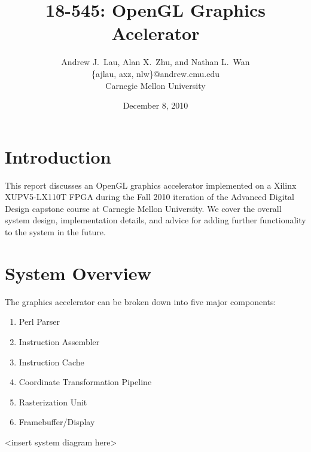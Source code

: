 \documentclass[letterpaper,10pt]{article}
\begin{document}

\title{\Large \bf 18-545: OpenGL Graphics Acelerator}
\author{
{\rm Andrew J.\ Lau, Alan X.\ Zhu, and Nathan L.\ Wan}\\
\{ajlau, axz, nlw\}@andrew.cmu.edu\\
Carnegie Mellon University
} %

\date{December 8, 2010}

\maketitle
\newpage
\tableofcontents
\listoffigures
\listoftables
\newpage
\thispagestyle{empty}

\section{Introduction}
This report discusses an OpenGL graphics accelerator implemented on a Xilinx XUPV5-LX110T FPGA during the Fall 2010 iteration of the Advanced Digital Design capstone course at Carnegie Mellon University. We cover the overall system design, implementation details, and advice for adding further functionality to the system in the future.

\section{System Overview}
The graphics accelerator can be broken down into five major components:
\begin{enumerate}

\item Perl Parser

\item Instruction Assembler

\item Instruction Cache

\item Coordinate Transformation Pipeline

\item Rasterization Unit

\item Framebuffer/Display

\end{enumerate}
<insert system diagram here>
\end{document}
